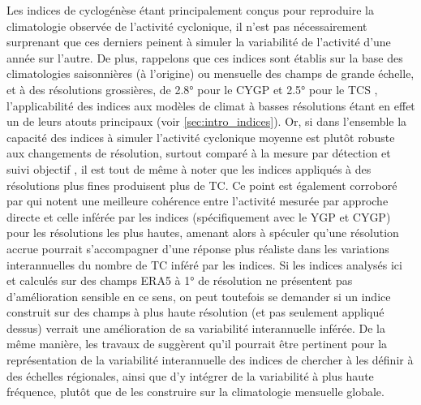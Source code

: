 \documentclass[../main.tex]{subfiles}
\begin{document}
Les indices de cyclogénèse étant principalement conçus pour reproduire la climatologie observée de l'activité cyclonique, il n'est pas nécessairement surprenant
que ces derniers peinent à simuler la variabilité de l'activité d'une année sur l'autre. De plus, rappelons que ces indices sont établis sur la base des
climatologies saisonnières (à l'origine) ou mensuelle des champs de grande échelle, et à des résolutions grossières, de \ang{2.8} pour le CYGP
\parencite{royer_gcm_1998} et \ang{2.5} pour le TCS \parencite{tippett_poisson_2011}, l'applicabilité des indices aux modèles de climat à basses résolutions
étant en effet un de leurs atouts principaux (voir \cref{sec:intro_indices}). Or, si dans l'ensemble la capacité des indices à simuler l'activité cyclonique
moyenne est plutôt robuste aux changements de résolution, surtout comparé à la mesure par détection et suivi objectif \parencite[][voir aussi
\cref{fig:GP_resolution}]{camargo_tropical_2007}, il est tout de même à noter que les indices appliqués à des résolutions plus fines produisent plus de TC. Ce
point est également corroboré par \textcite{mcdonald_tropical_2005} qui notent une meilleure cohérence entre l'activité mesurée par approche directe et celle
inférée par les indices (spécifiquement avec le YGP et CYGP) pour les résolutions les plus hautes, amenant alors \textcite{camargo_tropical_2007} à spéculer
qu'une résolution accrue pourrait s'accompagner d'une réponse plus réaliste dans les variations interannuelles du nombre de TC inféré par les indices. Si les
indices analysés ici et calculés sur des champs ERA5 à \ang{1} de résolution ne présentent pas d'amélioration sensible en ce sens, on peut toutefois se demander
si un indice construit sur des champs à plus haute résolution (et pas seulement appliqué dessus) verrait une amélioration de sa variabilité interannuelle
inférée. De la même manière, les travaux de \textcite{bruyere_investigating_2012,waters_largescale_2012} suggèrent qu'il pourrait être pertinent pour la
représentation de la variabilité interannuelle des indices de chercher à les définir à des échelles régionales, ainsi que d'y intégrer de la variabilité à plus
haute fréquence, plutôt que de les construire sur la climatologie mensuelle globale.
\end{document}

